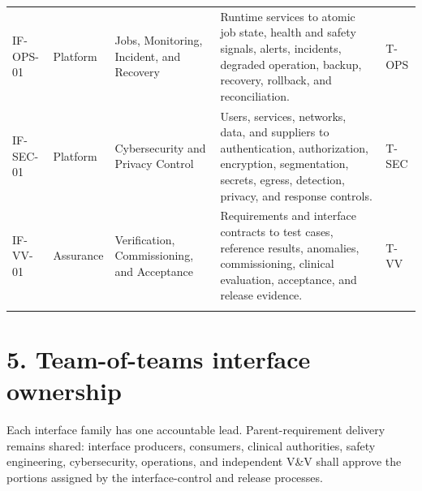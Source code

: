 \documentclass[11pt,letterpaper]{article}
\begin{document}
\begin{small}
\begin{longtable}{@{}L{0.13\textwidth}L{0.13\textwidth}L{0.25\textwidth}L{0.35\textwidth}L{0.06\textwidth}@{}}
\addlinespace[2pt]
IF-OPS-01 & Platform & Jobs, Monitoring, Incident, and Recovery & Runtime services to atomic job state, health and safety signals, alerts, incidents, degraded operation, backup, recovery, rollback, and reconciliation. & T-OPS \\
\addlinespace[2pt]
IF-SEC-01 & Platform & Cybersecurity and Privacy Control & Users, services, networks, data, and suppliers to authentication, authorization, encryption, segmentation, secrets, egress, detection, privacy, and response controls. & T-SEC \\
\addlinespace[2pt]
IF-VV-01 & Assurance & Verification, Commissioning, and Acceptance & Requirements and interface contracts to test cases, reference results, anomalies, commissioning, clinical evaluation, acceptance, and release evidence. & T-VV \\
\addlinespace[2pt]
\end{longtable}
\end{small}

\section{5. Team-of-teams interface ownership}
Each interface family has one accountable lead. Parent-requirement delivery remains shared: interface producers, consumers, clinical authorities, safety engineering, cybersecurity, operations, and independent V\&V shall approve the portions assigned by the interface-control and release processes.
\end{document}
